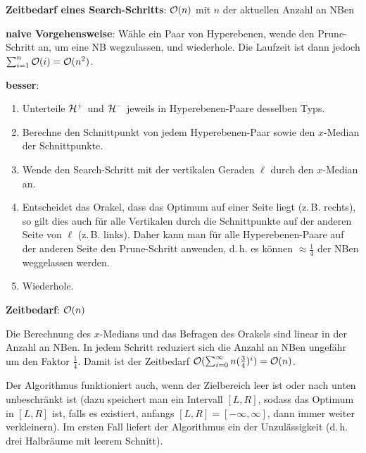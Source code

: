 \textbf{Zeitbedarf eines Search-Schritts}:
$\mathcal{O}(n)$ mit $n$ der aktuellen Anzahl an NBen

\linie

\textbf{naive Vorgehensweise}:
Wähle ein Paar von Hyperebenen, wende den Prune-Schritt an, um eine NB wegzulassen, und wiederhole.
Die Laufzeit ist dann jedoch $\sum_{i=1}^n \mathcal{O}(i) = \mathcal{O}(n^2)$.

\textbf{besser}:
\begin{enumerate}
    \item
    Unterteile $\mathcal{H}^+$ und $\mathcal{H}^-$ jeweils in Hyperebenen-Paare desselben Typs.
    
    \item
    Berechne den Schnittpunkt von jedem Hyperebenen-Paar sowie den $x$-Median der Schnittpunkte.
    
    \item
    Wende den Search-Schritt mit der vertikalen Geraden $\ell$ durch den $x$-Median an.
    
    \item
    Entscheidet das Orakel, dass das Optimum auf einer Seite liegt (z.\,B. rechts),
    so gilt dies auch für alle Vertikalen durch die Schnittpunkte auf der anderen Seite von $\ell$
    (z.\,B. links).
    Daher kann man für alle Hyperebenen-Paare auf der anderen Seite den Prune-Schritt anwenden,
    d.\,h. es können $\approx \frac{1}{4}$ der NBen weggelassen werden.
    
    \item
    Wiederhole.
\end{enumerate}

\textbf{Zeitbedarf}:
$\mathcal{O}(n)$

\begin{Beweis}
    Die Berechnung des $x$-Medians und das Befragen des Orakels sind linear in der Anzahl an NBen.
    In jedem Schritt reduziert sich die Anzahl an NBen ungefähr um den Faktor $\frac{1}{4}$.
    Damit ist der Zeitbedarf $\mathcal{O}(\sum_{i=0}^\infty n (\frac{3}{4})^i) = \mathcal{O}(n)$.
\end{Beweis}

\linie

Der Algorithmus funktioniert auch, wenn der Zielbereich leer ist oder nach unten
unbeschränkt ist (dazu speichert man ein Intervall $[L, R]$, sodass das Optimum in $[L, R]$ ist,
falls es existiert, anfangs $[L, R] = [-\infty, \infty]$, dann immer weiter verkleinern).
Im ersten Fall liefert der Algorithmus ein  der Unzulässigkeit
(d.\,h. drei Halbräume mit leerem Schnitt).


